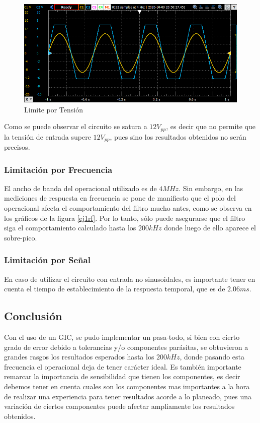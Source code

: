 \begin{figure}[H]
    \centering
    \includegraphics[scale = 0.8]{../Ejercicio1-FiltroConGIC/Informe/limtensionpng.png}
    \caption{Limite por Tensión}
    \label{ej1limt}
\end{figure}

Como se puede observar el circuito se satura a $12V_{pp}$, es decir que no permite que la tensión de entrada supere $12V_{pp}$, pues sino los resultados obtenidos no serán precisos.

\subsubsection{Limitación por Frecuencia}

El ancho de banda del operacional utilizado es de $4MHz$. Sin embargo, en las mediciones de respuesta en frecuencia se pone de manifiesto que el polo del operacional afecta el comportamiento del filtro mucho antes, como se observa en los gr\'aficos de la figura \ref{ej1rf}. Por lo tanto, s\'olo puede asegurarse que el filtro siga el comportamiento calculado hasta los $200kHz$ donde luego de ello aparece el sobre-pico.

\subsubsection{Limitación por Señal}

En caso de utilizar el circuito con entrada no sinusoidales, es importante tener en cuenta el tiempo de establecimiento de la respuesta temporal, que es de $2.06ms$. 

\subsection{Conclusión}

Con el uso de un GIC, se pudo implementar un pasa-todo, si bien con cierto grado de error debido a tolerancias y/o componentes parásitas, se obtuvieron a grandes rasgos los resultados esperados hasta los $200kHz$, donde pasando esta frecuencia el operacional deja de tener carácter ideal. Es también importante remarcar la importancia de sensibilidad que tienen los componentes, es decir debemos tener en cuenta cuales son los componentes mas importantes a la hora de realizar una experiencia para tener resultados acorde a lo planeado, pues una variación de ciertos componentes puede afectar ampliamente los resultados obtenidos. 
